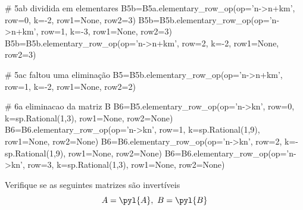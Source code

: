 \begin{pycode}
# 5ab dividida em elementares
B5b=B5a.elementary_row_op(op='n->n+km', row=0, k=-2, row1=None, row2=3)
B5b=B5b.elementary_row_op(op='n->n+km', row=1, k=-3, row1=None, row2=3)
B5b=B5b.elementary_row_op(op='n->n+km', row=2, k=-2, row1=None, row2=3)

# 5ac faltou uma eliminação
B5=B5b.elementary_row_op(op='n->n+km', row=1, k=-2, row1=None, row2=2)

# 6a eliminacao da matriz B
B6=B5.elementary_row_op(op='n->kn', row=0, k=sp.Rational(1,3), row1=None, row2=None)
B6=B6.elementary_row_op(op='n->kn', row=1, k=sp.Rational(1,9), row1=None, row2=None)
B6=B6.elementary_row_op(op='n->kn', row=2, k=-sp.Rational(1,9), row1=None, row2=None)
B6=B6.elementary_row_op(op='n->kn', row=3, k=sp.Rational(1,3), row1=None, row2=None)
\end{pycode}

\question Verifique se as seguintes matrizes são invertíveis
\[A=\pyl{A},\ B=\pyl{B}\]

